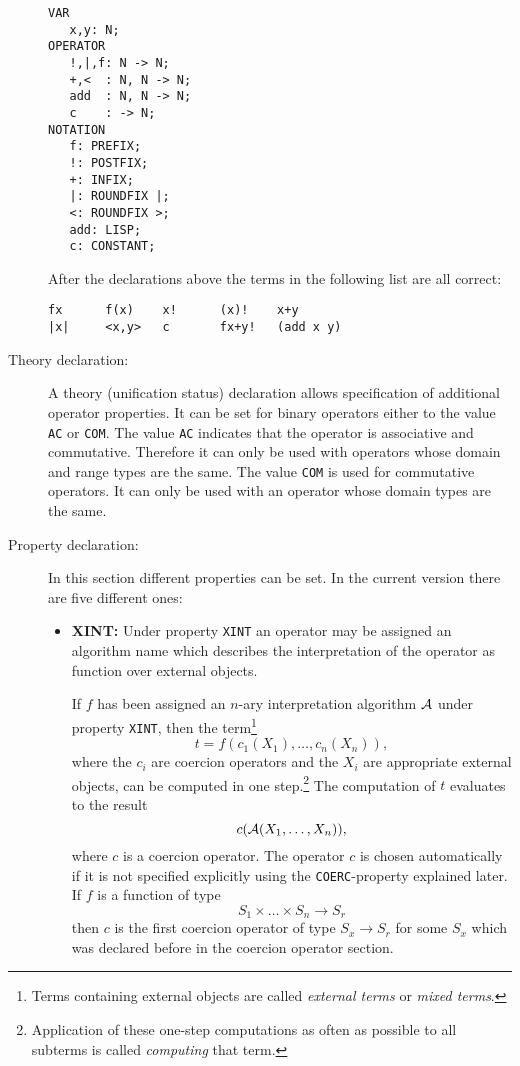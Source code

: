 \begin{description}
\begin{example} $ $
\begin{verbatim}
VAR
   x,y: N;
OPERATOR
   !,|,f: N -> N;
   +,<  : N, N -> N;
   add  : N, N -> N;
   c    : -> N;
NOTATION
   f: PREFIX;
   !: POSTFIX;
   +: INFIX;
   |: ROUNDFIX |;
   <: ROUNDFIX >;
   add: LISP;
   c: CONSTANT;
\end{verbatim}
{\rm After the declarations above the terms in the following list
are all correct:}
\begin{verbatim}
fx      f(x)    x!      (x)!    x+y
|x|     <x,y>   c       fx+y!   (add x y)
\end{verbatim}
\end{example}

\item[Theory declaration:]
A theory (unification status) declaration allows specification of additional operator properties.
It can be set for binary operators either to the value {\tt AC} or {\tt COM}.
The value {\tt AC} indicates that the operator is associative and commutative.
Therefore it can only be used with operators whose domain and range types are
the same. The value {\tt COM} is used for commutative operators. It can
only be used with an operator whose domain types are the same.

\item[Property declaration:]
In this section different properties can be set. In the current version
there are five different ones:
\begin{itemize}
\item{{\bf XINT:}} Under property {\tt XINT} an operator may be assigned 
an algorithm name which describes the interpretation of the operator as function
over external objects.

If $f$ has been assigned an $n$-ary interpretation algorithm ${\cal A}$ under property
{\tt XINT}, then the term\footnote{Terms containing external objects
are called {\em external terms} or {\em mixed terms}.}
$$ t = f(c_1(X_1),\dots,c_n(X_n)), $$
where the $c_i$ are coercion operators and the $X_i$ are appropriate
external objects,
can be computed in one step.\footnote{Application of these one-step computations
as often as possible to all subterms is called {\em computing} that term.}
The computation of $t$ evaluates to the result
$$ c({\cal A}(X_1,\dots,X_n)), $$
where $c$ is a coercion operator. The operator $c$ is chosen automatically if it
is not specified explicitly using the {\tt COERC}-property explained later.
If $f$ is a function of type
$$S_1 \times \dots \times S_n \rightarrow S_r$$
then $c$ is the
first coercion operator of type $S_x \rightarrow S_r$ for some $S_x$ which was declared
before in the coercion operator section.


\end{itemize}
\end{description}
